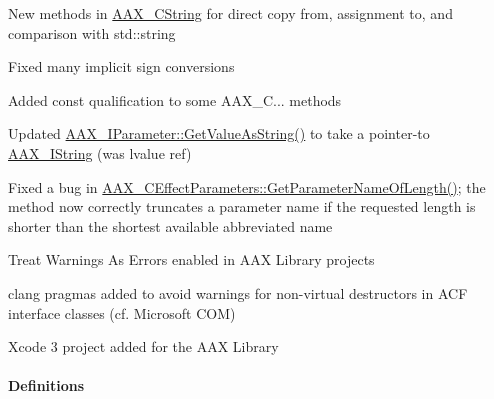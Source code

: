 \begin{DoxyItemize}
\item New methods in \mbox{\hyperlink{a01573}{A\+A\+X\+\_\+\+C\+String}} for direct copy from, assignment to, and comparison with std\+::string  
\item Fixed many implicit sign conversions  
\item Added {\ttfamily const} qualification to some A\+A\+X\+\_\+C... methods  
\item Updated \mbox{\hyperlink{a01857_ab0d640c37120decbbe48f0c1483770f9}{A\+A\+X\+\_\+\+I\+Parameter\+::\+Get\+Value\+As\+String()}} to take a pointer-\/to \mbox{\hyperlink{a01873}{A\+A\+X\+\_\+\+I\+String}} (was lvalue ref)  
\item Fixed a bug in \mbox{\hyperlink{a01481_af0bc3d6fb8f387f58a073f8902233bd3}{A\+A\+X\+\_\+\+C\+Effect\+Parameters\+::\+Get\+Parameter\+Name\+Of\+Length()}}; the method now correctly truncates a parameter name if the requested length is shorter than the shortest available abbreviated name  
\item Treat Warnings As Errors enabled in A\+AX Library projects  
\item clang pragmas added to avoid warnings for non-\/virtual destructors in A\+CF interface classes (cf. Microsoft C\+OM)  
\item Xcode 3 project added for the A\+AX Library  
\end{DoxyItemize}\hypertarget{a00847_aax_sdk_2p1p0_Definitions}{}\paragraph{Definitions}\label{a00847_aax_sdk_2p1p0_Definitions}

